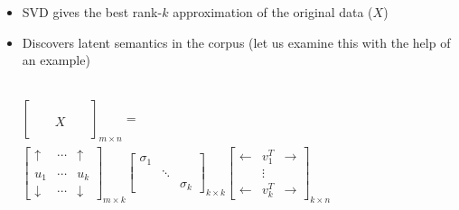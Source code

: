 \begin{frame}
\begin{columns}
\begin{overlayarea}{\textwidth}{\textheight}
{\begin{itemize}
					      $X_{PPMI}$ (simplifying notation to $X$) is the co-occurrence matrix with PPMI values
					\item<2-> SVD gives the best rank-$k$ approximation of the original data ($X$)
					\item<3-> Discovers latent semantics in the corpus (let us examine this with the help of an example)
				\end{itemize}
			}
		\end{overlayarea}
	\end{columns}
\end{frame}

\begin{frame}
	\begin{columns}
		\begin{overlayarea}{\textwidth}{\textheight}
			\vspace{0.5in}
			\footnotesize{
				\begin{align*}
					\begin{split}
						&\begin{bmatrix}
							  &   &   &   &   \\
							  &   &   &   &   \\
							  &   & X &   &   \\
							  &   &   &   &
						\end{bmatrix}_{m \times n} = \\
						&\begin{bmatrix}
							\uparrow   & \cdots & \uparrow   \\
							           &        &            \\
							u_1        & \cdots & u_k        \\
							\downarrow & \cdots & \downarrow
						\end{bmatrix}_{m \times k}
						\begin{bmatrix}
							\sigma_1 &        &          \\
							         & \ddots &          \\
							         &        & \sigma_k
						\end{bmatrix}_{k \times k}\begin{bmatrix}
							\leftarrow & v_1^T    & \rightarrow \\
							           & \vdots &             \\
							\leftarrow & v_k^T    & \rightarrow
						\end{bmatrix}_{k \times n}
					\end{split} \\

\end{align*}}
\end{overlayarea}
\end{columns}
\end{frame}
